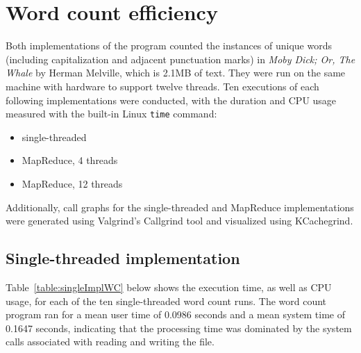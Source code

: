 \documentclass[12pt, letterpaper]{article}
\begin{document}
\section{Word count efficiency}
	Both implementations of the program counted the instances of unique words (including capitalization and adjacent punctuation marks) in \textit{Moby Dick; Or, The Whale} by Herman Melville, which is 2.1MB of text. They were run on the same machine with hardware to support twelve threads. Ten executions of each following implementations were conducted, with the duration and CPU usage measured with the built-in Linux \texttt{time} command:
	\begin{itemize}
	\item{single-threaded}
	\item{MapReduce, 4 threads}
	\item{MapReduce, 12 threads}
	\end{itemize}
	Additionally, call graphs for the single-threaded and MapReduce implementations were generated using Valgrind's Callgrind tool and visualized using KCachegrind.
\subsection{Single-threaded implementation}
	Table~\ref{table:singleImplWC} below shows the execution time, as well as CPU usage, for each of the ten single-threaded word count runs. The word count program ran for a mean user time of 0.0986 seconds and a mean system time of 0.1647 seconds, indicating that the processing time was dominated by the system calls associated with reading and writing the file.
	
\end{document}
